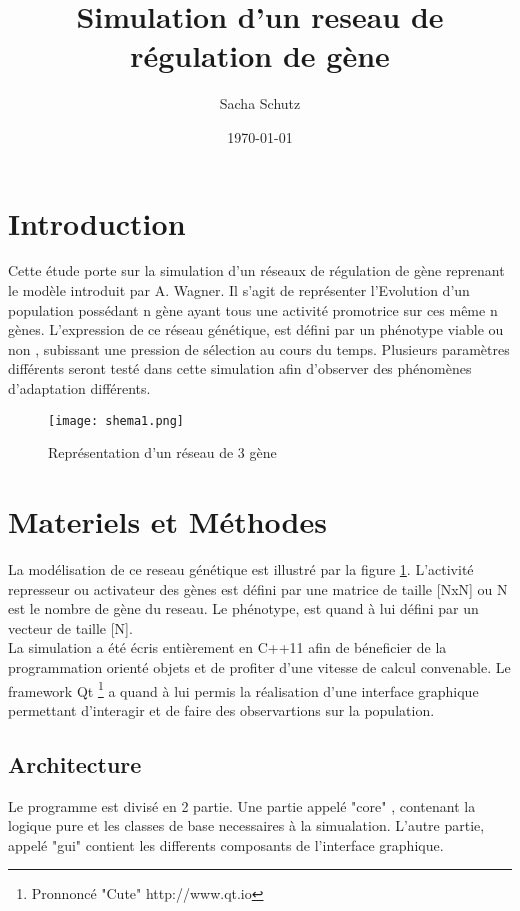 \documentclass{article}
\title {Simulation d'un reseau de régulation de gène}
\author {Sacha Schutz}
\date {\today}
\begin{document}
	\maketitle

	\section{Introduction} %
	Cette étude porte sur la simulation d'un réseaux de régulation de gène reprenant le modèle introduit par A. Wagner. Il s'agit de représenter l'Evolution d'un population possédant n gène ayant tous une activité promotrice sur ces même n gènes. L'expression de ce réseau génétique, est défini par un phénotype viable ou non , subissant une pression de sélection au cours du temps. 
	Plusieurs paramètres différents seront testé dans cette simulation afin d'observer des phénomènes d'adaptation différents. 

	\begin{figure}[h]
	\label{figure1}
	\caption[test]{Représentation d'un réseau de 3 gène }
	\centering
	\texttt{[image: shema1.png]}
	\end{figure}

	\section{Materiels et Méthodes} 
	La modélisation de ce reseau génétique est illustré par la figure \ref{figure1}. L'activité represseur ou activateur des gènes est défini par une matrice de taille [NxN] ou N est le nombre de gène du reseau. Le phénotype, est quand à lui défini par un vecteur de taille [N]. \\
	La simulation a été écris entièrement en C++11 afin de béneficier de la programmation orienté objets et de profiter d'une vitesse de calcul convenable. Le framework Qt \footnote{Pronnoncé "Cute"  http://www.qt.io} a quand à lui permis la réalisation d'une interface graphique permettant d'interagir et de faire des observartions sur la population. 
	\subsection {Architecture}
	Le programme est divisé en 2 partie. Une partie appelé "core" , contenant la logique pure et les classes de base necessaires à la simualation. L'autre partie, appelé "gui" contient les differents composants de l'interface graphique.
\end{document}

